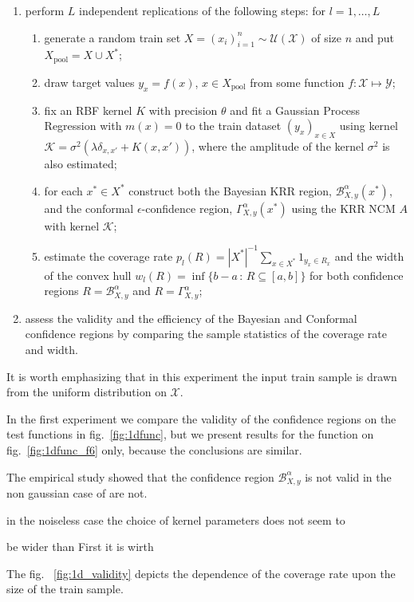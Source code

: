 \documentclass{ITaSconf}
\newcommand{\Bcal}{\mathcal{B}}
\newcommand{\Kcal}{\mathcal{K}}
\newcommand{\Xcal}{\mathcal{X}}
\newcommand{\Ycal}{\mathcal{Y}}
\begin{document}
\begin{enumerate}
  \item perform $L$ independent replications of the following steps: for $l=1,\ldots, L$
  \begin{enumerate}
    \item generate a random train set $X = (x_i)_{i=1}^n\sim \mathcal{U}(\Xcal)$ of
    size $n$ and put $X_{\text{pool}} = X \cup X^*$;
    \item draw target values $y_x = f(x)$, $x\in X_{\text{pool}}$ from some function
    $f:\Xcal \mapsto \Ycal$;
    \item fix an RBF kernel $K$ with precision $\theta$ and fit a Gaussian Process
    Regression with $m(x) = 0$ to the train dataset $(y_x)_{x\in X}$ using kernel
    $\Kcal = \sigma^2(\lambda \delta_{x,x'} + K(x,x'))$, where the amplitude of
    the kernel $\sigma^2$ is also estimated;
    \item for each $x^* \in X^*$ construct both the Bayesian KRR region, $\Bcal_{X, y}^\alpha(x^*)$,
    and the conformal $\epsilon$-confidence region, $\Gamma_{X, y}^\alpha(x^*)$ using
    the KRR NCM $A$ with kernel $\Kcal$;
    \item estimate the coverage rate $p_l(R) = |X^*|^{-1}\sum_{x\in X^*} 1_{y_x\in R_x}$
    and the width of the convex hull $w_l(R) = \inf\{b-a\,:\,R \subseteq [a, b]\}$
    for both confidence regions $R=\Bcal_{X, y}^\alpha$ and $R=\Gamma_{X, y}^\alpha$;
  \end{enumerate}
  \item assess the validity and the efficiency of the Bayesian and Conformal confidence
  regions by comparing the sample statistics of the coverage rate and width.
\end{enumerate}
It is worth emphasizing that in this experiment the input train sample is drawn from
the uniform distribution on $\Xcal$.

In the first experiment we compare the validity of the confidence regions on the
test functions in fig.~\ref{fig:1dfunc}, but we present results for the function
on fig.~\ref{fig:1dfunc_f6} only, because the conclusions are similar.

The empirical study showed that the confidence region $\Bcal_{X, y}^\alpha$ is not
valid in the non gaussian case of are not.

in the noiseless case the choice of kernel parameters does not seem to 

be wider than
First it is wirth 


The fig.~
\ref{fig:1d_validity} depicts the dependence of the coverage rate upon the size of the
train sample.
\end{document}
